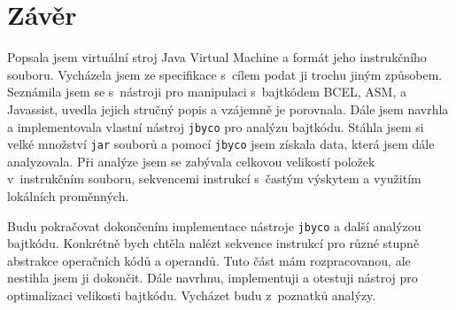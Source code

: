 \chapter{Závěr}\label{Conclusion}


Popsala jsem virtuální stroj Java Virtual Machine a formát jeho instrukčního souboru. Vycházela jsem ze specifikace \cite{Lindholm:JVM} s~cílem podat ji trochu jiným způsobem. Seznámila jsem se s~nástroji pro manipulaci s~bajtkódem BCEL, ASM, a Javassist, uvedla jejich stručný popis a vzájemně je porovnala. Dále jsem navrhla a implementovala vlastní nástroj \texttt{jbyco} pro analýzu bajtkódu. Stáhla jsem si velké množství \texttt{jar} souborů a pomocí \texttt{jbyco} jsem získala data, která jsem dále analyzovala. Při analýze jsem se zabývala celkovou velikostí položek v~instrukčním souboru, sekvencemi instrukcí s~častým výskytem a využitím lokálních proměnných.

Budu pokračovat dokončením implementace nástroje \texttt{jbyco} a další analýzou bajtkódu. Konkrétně bych chtěla nalézt sekvence instrukcí pro různé stupně abstrakce operačních kódů a operandů. Tuto část mám rozpracovanou, ale nestihla jsem ji dokončit. Dále navrhnu, implementuji a otestuji nástroj pro optimalizaci velikosti bajtkódu. Vycházet budu z~poznatků analýzy.


